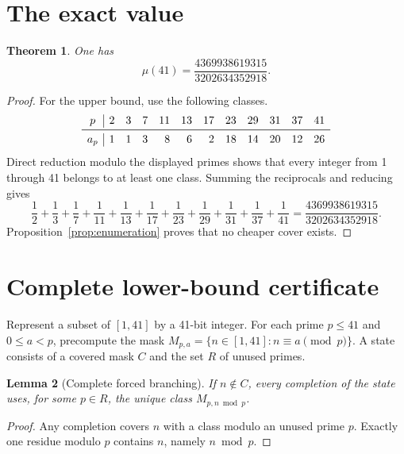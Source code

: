 \documentclass[11pt]{amsart}
\newtheorem{theorem}{Theorem}
\newtheorem{lemma}[theorem]{Lemma}
\begin{document}
\section{The exact value}
\begin{theorem}\label{thm:main}
One has
\[
\boxed{\displaystyle \mu(41)=\frac{4369938619315}{3202634352918}}.
\]
\end{theorem}
\begin{proof}
For the upper bound, use the following classes.
\[
\begin{array}{c|rrrrrrrrrrr}
p&2&3&7&11&13&17&23&29&31&37&41\\ \midrule
a_p&1&1&3&8&6&2&18&14&20&12&26
\end{array}
\]
Direct reduction modulo the displayed primes shows that every integer from 1
through 41 belongs to at least one class.  Summing the reciprocals and reducing
gives
\[
 \frac12+\frac13+\frac17+\frac1{11}+\frac1{13}+\frac1{17}
 +\frac1{23}+\frac1{29}+\frac1{31}+\frac1{37}+\frac1{41}
 =\frac{4369938619315}{3202634352918}.
\]
Proposition~\ref{prop:enumeration} proves that no cheaper cover exists.
\end{proof}

\section{Complete lower-bound certificate}
Represent a subset of $[1,41]$ by a 41-bit integer.  For each prime $p\le41$
and $0\le a<p$, precompute the mask
$M_{p,a}=\{n\in[1,41]:n\equiv a\pmod p\}$.  A state consists of a covered mask
$C$ and the set $R$ of unused primes.
\begin{lemma}[Complete forced branching]\label{lem:branch}
If $n\notin C$, every completion of the state uses, for some $p\in R$, the
unique class $M_{p,n\bmod p}$.
\end{lemma}
\begin{proof}
Any completion covers $n$ with a class modulo an unused prime $p$.  Exactly one
residue modulo $p$ contains $n$, namely $n\bmod p$.
\end{proof}
\end{document}
